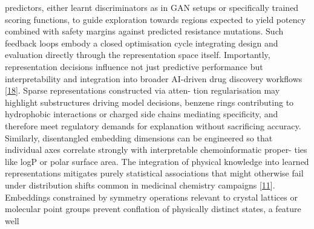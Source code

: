 \documentclass[
]{article}
\begin{document}
predictors, either learnt discriminators as in GAN setups or
specifically trained scoring functions, to guide exploration towards
regions expected to yield potency combined with safety margins against
predicted resistance mutations. Such feedback loops embody a closed
optimisation cycle integrating design and evaluation directly through
the representation space itself. Importantly, representation decisions
influence not just predictive performance but interpretability and
integration into broader AI-driven drug discovery workflows
{[}\protect\hyperlink{_bookmark58}{18}{]}. Sparse representations
constructed via atten- tion regularisation may highlight substructures
driving model decisions, benzene rings contributing to hydrophobic
interactions or charged side chains mediating specificity, and therefore
meet regulatory demands for explanation without sacrificing accuracy.
Similarly, disentangled embedding dimensions can be engineered so that
individual axes correlate strongly with interpretable chemoinformatic
proper- ties like logP or polar surface area. The integration of
physical knowledge into learned representations mitigates purely
statistical associations that might otherwise fail under distribution
shifts common in medicinal chemistry campaigns
{[}\protect\hyperlink{_bookmark51}{11}{]}. Embeddings constrained by
symmetry operations relevant to crystal lattices or molecular point
groups prevent conflation of physically distinct states, a feature well
\end{document}
